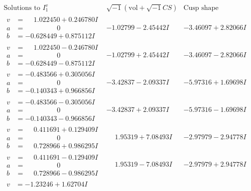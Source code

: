 \documentclass[1p]{elsarticle_modified}
\theoremstyle{definition}
\newcommand{\I}{\sqrt{-1}}
\begin{document}
$$\begin{array}{c|c|c}  
\text{Solutions to }I^v_{1}& \I (\text{vol} + \sqrt{-1}CS) & \text{Cusp shape}\\
 \hline 
\begin{aligned}
v &= \phantom{-}1.022450 + 0.246780 I \\
a &= \phantom{-0.000000 } 0 \\
b &= -0.628449 + 0.875112 I\end{aligned}
 & -1.02799 - 2.45442 I & -3.46097 + 2.82066 I \\ \hline\begin{aligned}
v &= \phantom{-}1.022450 - 0.246780 I \\
a &= \phantom{-0.000000 } 0 \\
b &= -0.628449 - 0.875112 I\end{aligned}
 & -1.02799 + 2.45442 I & -3.46097 - 2.82066 I \\ \hline\begin{aligned}
v &= -0.483566 + 0.305056 I \\
a &= \phantom{-0.000000 } 0 \\
b &= -0.140343 + 0.966856 I\end{aligned}
 & -3.42837 - 2.09337 I & -5.97316 + 1.69698 I \\ \hline\begin{aligned}
v &= -0.483566 - 0.305056 I \\
a &= \phantom{-0.000000 } 0 \\
b &= -0.140343 - 0.966856 I\end{aligned}
 & -3.42837 + 2.09337 I & -5.97316 - 1.69698 I \\ \hline\begin{aligned}
v &= \phantom{-}0.411691 + 0.129409 I \\
a &= \phantom{-0.000000 } 0 \\
b &= \phantom{-}0.728966 + 0.986295 I\end{aligned}
 & \phantom{-}1.95319 + 7.08493 I & -2.97979 - 2.94778 I \\ \hline\begin{aligned}
v &= \phantom{-}0.411691 - 0.129409 I \\
a &= \phantom{-0.000000 } 0 \\
b &= \phantom{-}0.728966 - 0.986295 I\end{aligned}
 & \phantom{-}1.95319 - 7.08493 I & -2.97979 + 2.94778 I \\ \hline\begin{aligned}
v &= -1.23246 + 1.62704 I \\

\end{aligned}
\end{array}$$
\end{document}
